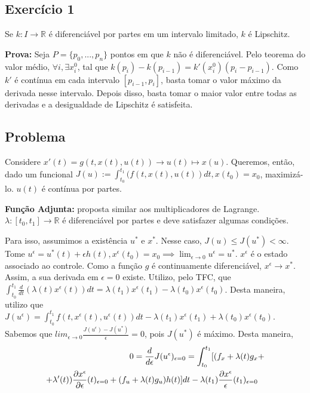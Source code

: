\subsection*{Exercício 1}
Se $k: I \to \mathbb{R}$ é diferenciável por partes em um intervalo limitado, $k$ é Lipschitz. 

\textbf{Prova:} Seja $P = \{p_0, ..., p_n\}$ pontos em que $k$ não é diferenciável. Pelo teorema do valor médio, $\forall i, \exists x_i^0 $, tal que $k(p_i) - k(p_{i-1}) = k'(x_i^0)(p_i - p_{i-1})$. Como $k'$ é contínua em cada intervalo $[p_{i-1},p_i]$, basta tomar o valor máximo da derivada nesse intervalo. Depois disso, basta tomar o maior valor entre todas as derivadas e a desigualdade de Lipschitz é satisfeita. 

\subsection{Problema} 

Considere $x'(t) = g(t,x(t),u(t)) \to u(t) \mapsto x(u)$. Queremos, então, dado um funcional $ J(u) := \int_{t_0}^{t_1} (f(t,x(t),u(t))dt, x(t_0) = x_0$, maximizá-lo.  $u(t)$ é contínua por partes. 

\textbf{Função Adjunta:} proposta similar aos multiplicadores de Lagrange. $\lambda : [t_0,t_1] \to \mathbb{R}$ é diferenciável por partes e deve satisfazer algumas condições. 

Para isso, assumimos a existência $u^*$ e $x^*$. Nesse caso, $J(u) \leq J(u^*) < \infty$. Tome $u^{\epsilon} = u^{*}(t) + \epsilon h(t), x^{\epsilon}(t_0) = x_0 \implies \lim_{\epsilon\to 0} u^{\epsilon} = u^{*}$. $x^{\epsilon}$ é o estado associado ao controle. Como a função $g$ é continuamente diferenciável, $x^{\epsilon} \to x^{*}$. Assim, a sua derivada em $\epsilon = 0$ existe. Utilizo, pelo TFC, que $\int_{t_0}^{t_1} \frac{d}{dt}(\lambda (t)x^{\epsilon}(t))dt = \lambda(t_1)x^{\epsilon}(t_1) - \lambda(t_0)x^{\epsilon}(t_0)$. Desta maneira, utilizo que $J(u^{\epsilon}) = \int_{t_0}^{t_1} f(t,x^{\epsilon}(t),u^{\epsilon}(t))dt - \lambda(t_1)x^{\epsilon}(t_1) + \lambda(t_0)x^{\epsilon}(t_0)$. Sabemos que $lim_{\epsilon \to 0} \frac{J(u^{\epsilon}) - J(u^{*})}{\epsilon} = 0$, pois $J(u^*)$ é máximo. Desta maneira, 
\begin{align} \label{eq1}
0 = \frac{d}{d\epsilon} J(u^{\epsilon})_{\epsilon = 0} = \int_{t_0}^{t_1} [(f_x + \lambda(t)g_x & + \\ 
 + \lambda '(t))\frac{\partial x^{\epsilon}}{\partial\epsilon}(t)_{\epsilon = 0} + (f_u + \lambda(t)g_u)h(t)]dt - \lambda(t_1)\frac{\partial x^{\epsilon}}{\epsilon}(t_1)_{\epsilon = 0}
\end{align}


